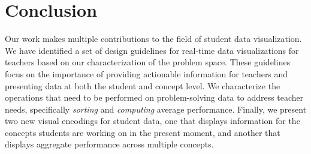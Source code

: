 \documentclass{sigchi}
\begin{document}
%
%
%

\section{Conclusion}
Our work makes multiple contributions to the field of student data visualization. We have identified a set of design guidelines for real-time data visualizations for teachers based on our characterization of the problem space. These guidelines focus on the importance of providing actionable information for teachers and presenting data at both the student and concept level. We characterize the operations that need to be performed on problem-solving data to address teacher needs, specifically \emph{sorting} and \emph{computing} average performance. Finally, we present two new visual encodings for student data, one that displays information for the concepts students are working on in the present moment, and another that displays aggregate performance across multiple concepts.
\end{document}

